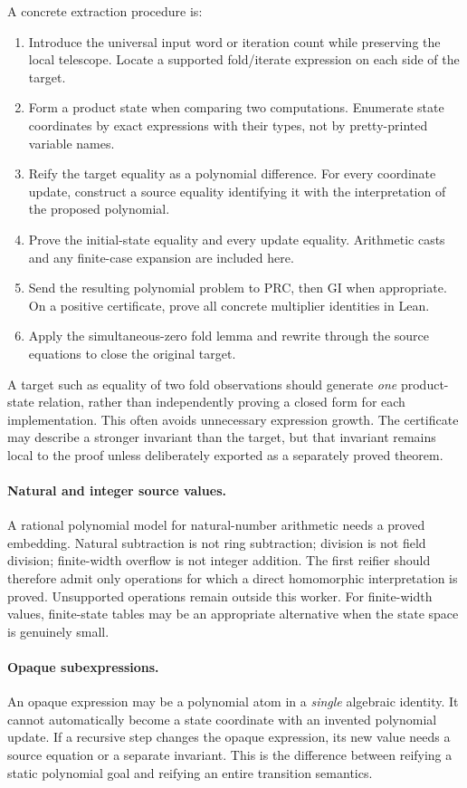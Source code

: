 A concrete extraction procedure is:
\begin{enumerate}[leftmargin=1.6em]
\item Introduce the universal input word or iteration count while preserving the local telescope. Locate a supported fold/iterate expression on each side of the target.
\item Form a product state when comparing two computations. Enumerate state coordinates by exact expressions with their types, not by pretty-printed variable names.
\item Reify the target equality as a polynomial difference. For every coordinate update, construct a source equality identifying it with the interpretation of the proposed polynomial.
\item Prove the initial-state equality and every update equality. Arithmetic casts and any finite-case expansion are included here.
\item Send the resulting polynomial problem to PRC, then GI when appropriate. On a positive certificate, prove all concrete multiplier identities in Lean.
\item Apply the simultaneous-zero fold lemma and rewrite through the source equations to close the original target.
\end{enumerate}

A target such as equality of two fold observations should generate \emph{one} product-state relation, rather than independently proving a closed form for each implementation. This often avoids unnecessary expression growth. The certificate may describe a stronger invariant than the target, but that invariant remains local to the proof unless deliberately exported as a separately proved theorem.

\paragraph{Natural and integer source values.}
A rational polynomial model for natural-number arithmetic needs a proved embedding. Natural subtraction is not ring subtraction; division is not field division; finite-width overflow is not integer addition. The first reifier should therefore admit only operations for which a direct homomorphic interpretation is proved. Unsupported operations remain outside this worker. For finite-width values, finite-state tables may be an appropriate alternative when the state space is genuinely small.

\paragraph{Opaque subexpressions.}
An opaque expression may be a polynomial atom in a \emph{single} algebraic identity. It cannot automatically become a state coordinate with an invented polynomial update. If a recursive step changes the opaque expression, its new value needs a source equation or a separate invariant. This is the difference between reifying a static polynomial goal and reifying an entire transition semantics.

